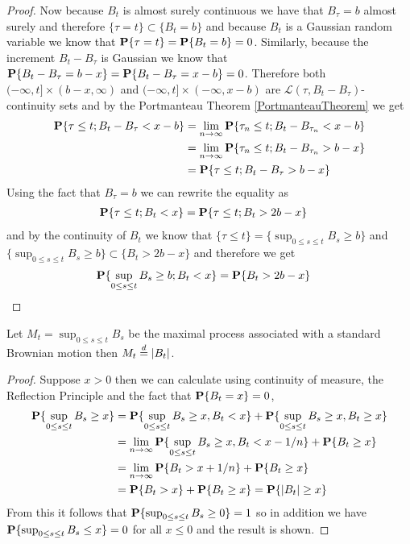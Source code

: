 \begin{proof}
Now because $B_t$ is almost surely continuous we have that $B_\tau =
b$ almost surely and therefore $\lbrace \tau = t  \rbrace \subset
\lbrace B_t = b \rbrace$ and because $B_t$ is a Gaussian random
variable we know that $\textbf{P}\{\tau = t\} = \textbf{P}\{B_t = b\}
= 0$.  Similarly, because the increment $B_t - B_\tau$ is Gaussian we
know that $\textbf{P}\{B_t - B_\tau = b -x \} = \textbf{P}\{B_t -
  B_\tau = x-b\} = 0$.  Therefore both $(-\infty, t] \times (b-x,\infty)$ and $(-\infty, t] \times (-\infty,x-b)$ are
$\mathcal{L}(\tau,B_t - B_\tau)$-continuity sets and by the
Portmanteau Theorem \ref{PortmanteauTheorem} we get
\begin{align*}
\textbf{P}\{\tau \leq t; B_t - B_\tau < x - b\}
&= \lim_{n \to \infty} \textbf{P}\{\tau_n \leq  t; B_t - B_{\tau_n} < x - b\} \\
&= \lim_{n \to \infty} \textbf{P}\{\tau_n \leq t; B_t - B_{\tau_n} >  b - x\} \\
&=\textbf{P}\{\tau \leq t; B_t - B_\tau > b - x\}
\end{align*}
Using the fact that $B_\tau = b$ we can rewrite the equality as
\begin{align*}
\textbf{P}\{\tau \leq t; B_t < x \}
&=\textbf{P}\{\tau \leq t; B_t > 2b - x\}
\end{align*}
and by the continuity of $B_t$ we know that $\lbrace \tau \leq t
\rbrace = \lbrace \sup_{0 \leq s \leq t} B_s \geq b \rbrace$ and $
\lbrace \sup_{0 \leq s \leq t} B_s \geq b \rbrace \subset \lbrace B_t
> 2b - x\rbrace$ and therefore we get
\begin{align*}
\textbf{P}\{\sup_{0 \leq s \leq t} B_s \geq b ; B_t < x \}
&=\textbf{P}\{B_t > 2b - x\}
\end{align*}
\end{proof}

\begin{lem}\label{BrownianMaximumProcessLaw}Let $M_t = \sup_{0 \leq s \leq t}
  B_s$ be the maximal process associated with a standard Brownian
  motion then $M_t \overset{d}= \left \vert B_t \right \vert$.
\end{lem}
\begin{proof}
Suppose $x > 0$ then we can calculate using continuity of measure, the Reflection Principle
and the fact that $\textbf{P}\{B_t = x\} = 0$,
\begin{align*}
\textbf{P}\{ \sup_{0 \leq s \leq t} B_s \geq x\}
&=\textbf{P}\{ \sup_{0 \leq s \leq t} B_s \geq x, B_t < x\} +
\textbf{P}\{ \sup_{0 \leq s \leq t} B_s \geq x, B_t \geq x\} \\
&=\lim_{n \to \infty} \textbf{P}\{ \sup_{0 \leq s \leq t} B_s \geq x,
  B_t < x- 1/n\} + 
\textbf{P}\{B_t \geq x\} \\
&=\lim_{n \to \infty} \textbf{P}\{ B_t > x + 1/n\} + 
\textbf{P}\{B_t \geq x\} \\
&= \textbf{P}\{B_t > x\} + \textbf{P}\{B_t \geq x\} = \textbf{P}\{\left \vert B_t \right \vert \geq x\}\\
\end{align*}
From this it follows that $\textbf{P}\{ \sup_{0 \leq s \leq t} B_s
  \geq 0\} = 1$ so in addition we have $\textbf{P}\{ \sup_{0 \leq s \leq t} B_s
  \leq x\} = 0$ for all $x \leq 0$ and the result is shown.
\end{proof}

